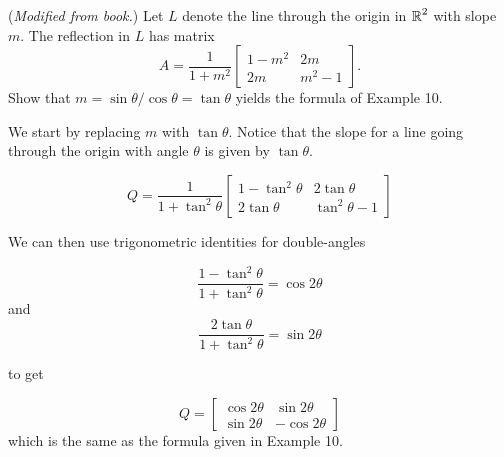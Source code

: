 \documentclass[../main.tex]{subfiles}
\begin{document}
(\emph{Modified from book.})
Let $L$ denote the line through the origin in $\operatorname{\mathbb{R}}^2$ with slope $m$.
The reflection in $L$ has matrix
\[
	A
	=
	\frac{1}{1 + m^2}
	\begin{bmatrix}
		1 - m^2 & 2m \\
		2m & m^2 - 1
	\end{bmatrix}.
\]
Show that $m = \sin\theta/\cos\theta = \tan\theta$ yields the formula of Example 10.

\solution

We start by replacing $m$ with $\tan\theta$. Notice that the slope for a line going through the
origin with angle $\theta$ is given by $\tan\theta$.

\[
    Q = \frac{1}{1+\tan^2\theta}
        \begin{bmatrix}
            1 - \tan^2\theta & 2\tan\theta\\
            2\tan\theta & \tan^2\theta-1
        \end{bmatrix}
\]

We can then use trigonometric identities for double-angles

\[
    \frac{1-\tan^2\theta}{1+\tan^2\theta} = \cos2\theta
\]
and
\[
    \frac{2\tan\theta}{1+\tan^2\theta} = \sin2\theta
\]

to get

\[ Q = \begin{bmatrix}
            \cos2\theta & \sin2\theta\\
            \sin2\theta & -\cos2\theta
        \end{bmatrix}
\]
which is the same as the formula given in Example 10.
\end{document}
